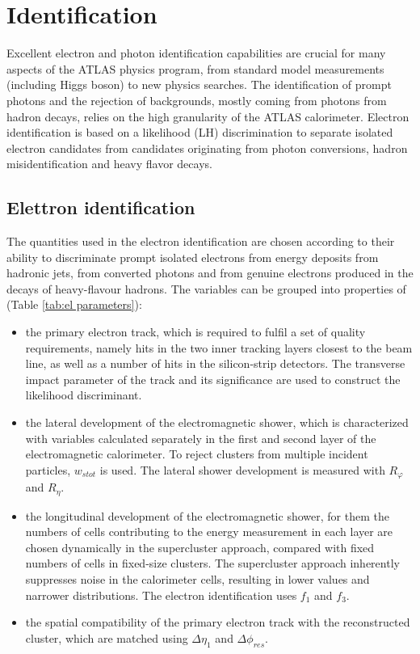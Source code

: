 \documentclass[a4paper, oneside]{book}
\begin{document}
		\section{Identification}\label{section:Ident}
		\cite{Identification}Excellent electron and photon identification capabilities are crucial for many aspects of the ATLAS physics program, from standard model measurements (including Higgs boson) to new physics searches. The identification of prompt photons and the rejection of backgrounds, mostly coming from photons from hadron decays, relies on the high granularity of the ATLAS calorimeter. Electron identification is based on a likelihood (LH) discrimination to separate isolated electron candidates from candidates originating from photon conversions, hadron misidentification and heavy flavor decays. 
			\subsection{Elettron identification}
			\cite{El ph reco}The quantities used in the electron identification are chosen according to their ability to discriminate prompt isolated electrons from energy deposits from hadronic jets, from converted photons and from genuine electrons produced in the decays of heavy-flavour hadrons. The variables can be
			grouped into properties of (Table \ref{tab:el parameters}):
			\begin{itemize}
				\item the primary electron track, which is required to fulfil a set of quality requirements, namely hits in the two inner tracking layers closest to the beam line, as well as a number of hits in the silicon-strip detectors. The transverse impact parameter of the track and its significance are used to construct
				the likelihood discriminant.
				\item the lateral development of the electromagnetic shower, which is characterized with variables calculated separately in the first and second layer of the electromagnetic calorimeter. To reject clusters from multiple incident particles, $w_{s tot}$ is used. The lateral shower development is measured with $R_{\varphi}$ and $R_{\eta}$.
				\item the longitudinal development of the electromagnetic shower, for them the numbers of cells contributing to the energy
				measurement in each layer are chosen dynamically in the supercluster approach, compared with fixed numbers of cells in fixed-size clusters. The supercluster approach inherently suppresses noise in the calorimeter cells, resulting in lower values and narrower distributions. The electron
				identification uses $f_1$ and $f_3$.
				\item the spatial compatibility of the primary electron track with the reconstructed cluster, which are matched using $\Delta\eta_1$ and $\Delta\phi_{res}$. 
			\end{itemize}
\end{document}
